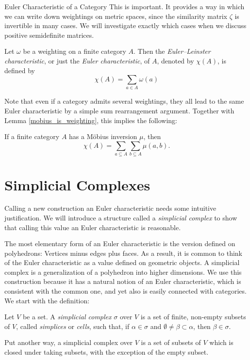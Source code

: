 \documentclass[12pt]{pom_thesis}
\begin{document}
\begin{chapter}{Euler Characteristic of a Category}
This is important. It provides a way in which we can write down weightings on metric spaces, since the similarity matrix $\zeta$ is invertible in many cases. We will investigate exactly which cases when we discuss positive semidefinite matrices.

\begin{defn}\label{cat_euler}
Let $\omega$ be a weighting on a finite category $A$. Then the \emph{Euler--Leinster characteristic}, or just the \emph{Euler characteristic}, of $A$, denoted by $\chi(A)$, is defined by
\[
\chi(A) = \sum_{a \in A} \omega(a)
\]
\end{defn}
Note that even if a category admits several weightings, they all lead to the same Euler characteristic by a simple sum rearrangement argument. Together with Lemma \ref{mobius_is_weighting}, this implies the following:
\begin{cor}\label{euler_mu}
If a finite category $A$ has a M\"obius inversion $\mu$, then
\[\chi(A) = \sum_{a \subseteq A} \sum_{b \subseteq A} \mu(a, b).
\]
\end{cor}
\section{Simplicial Complexes}
Calling a new construction an Euler characteristic needs some intuitive justification. We will introduce a structure called a \textit{simplicial complex} to show that calling this value an Euler characteristic is reasonable. 

The most elementary form of an Euler characteristic is the version defined on polyhedrons: Vertices minus edges plus faces. As a result, it is common to think of the Euler characteristic as a value defined on geometric objects. A simplicial complex is a generalization of a polyhedron into higher dimensions. We use this construction because it has a natural notion of an Euler characteristic, which is consistent with the common one, and yet also is easily connected with categories. We start with the definition:

\begin{defn}
Let $V$ be a set. A \emph{simplicial complex} $\sigma$ over $V$ is a set of finite, non-empty subsets of $V$, called \emph{simplices} or \emph{cells}, such that, if $\alpha \in \sigma$ and $\emptyset \neq \beta \subset \alpha$, then $\beta \in \sigma$.
\end{defn}

Put another way, a simplicial complex over $V$  is a set of subsets of $V$ which is closed under taking subsets, with the exception of the empty subset. 


\end{chapter}
\end{document}
